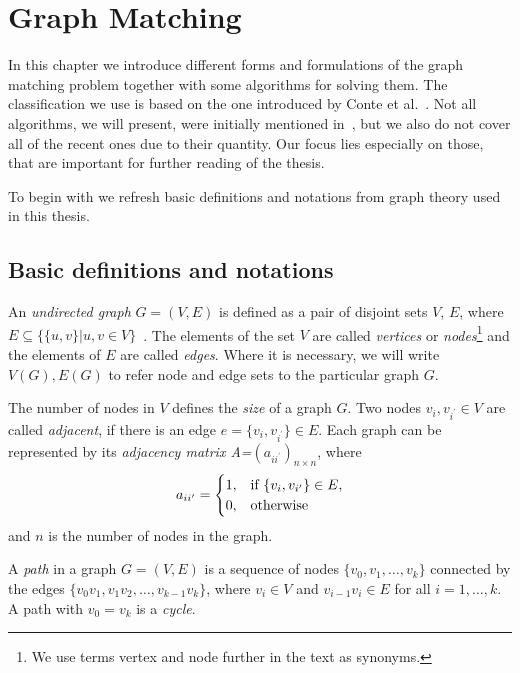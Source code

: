 
\chapter{Graph Matching} \label{chapter:GM}
In this chapter we introduce different forms and formulations of the graph matching problem together with some algorithms for solving them.
The classification we use is based on the one introduced by Conte et al.~\cite{Conte2004}. Not all algorithms, we will present, were initially mentioned in~\cite{Conte2004}, but we also do not cover all of the recent ones due to their quantity. Our focus lies especially on those, that are important for further reading of the thesis.

To begin with we refresh basic definitions and notations from graph theory used in this thesis.
\section{Basic definitions and notations}
An \emph{undirected graph} $G=(V,E)$ is defined as a pair of disjoint sets $V$, $E$, where $E\subseteq\{\{u,v\}| u, v\in V\}$~\cite{Diestel2000}. The elements of the set $V$ are called \emph{vertices} or \emph{nodes}\footnote{We use terms vertex and node further in the text as synonyms.} and the elements of $E$ are called \emph{edges}. Where it is necessary, we will write $V(G), E(G)$ to refer node and edge sets to the particular graph $G$.

The number of nodes in $V$ defines the \emph{size} of a graph $G$.
Two nodes $v_{i},v_{i^\prime}\in V$ are called \emph{adjacent}, if there is an edge $e=\{v_{i},v_{i^\prime}\}\in E$. Each graph can be represented by its \emph{adjacency matrix A=$(a_{ii^\prime})_{n\times n}$}, where 
\begin{equation*}\centering
a_{ii^\prime}=\begin{cases}
 1, & \text{if } \{v_{i},v_{i^\prime}\}\in E, \\
 0, & \text{otherwise} \\
\end{cases}
\end{equation*}
and $n$ is the number of nodes in the graph.

A \emph{path} in a graph $G=(V,E)$ is a sequence of nodes $\{v_0,v_1,\dots,v_k\}$ connected by the edges $\{v_0v_1,v_1v_2,\dots,v_{k-1}v_k\}$, where $v_i\in V$ and $v_{i-1}v_i\in E$ for all $i=1,\dots,k$. A path with $v_0=v_k$ is a \emph{cycle}.

